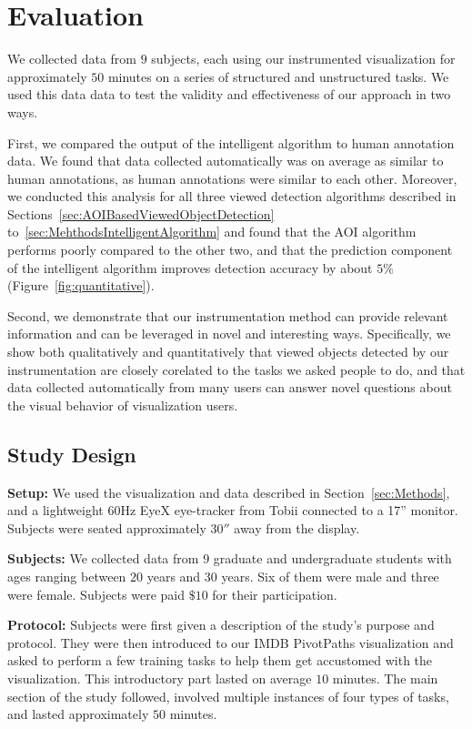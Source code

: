 \section{Evaluation}
\label{sec:Evaluation}
We collected data from $9$ subjects, each using our instrumented visualization for approximately $50$ minutes on a series of structured and unstructured tasks. We used this data data to test the validity and effectiveness of our approach in two ways. 

First, we compared the output of the intelligent algorithm to human annotation data. We found that data collected automatically was on average as similar to human annotations, as human annotations were similar to each other. Moreover, we conducted this analysis for all three viewed detection algorithms described in Sections~\ref{sec:AOIBasedViewedObjectDetection} to~\ref{sec:MehthodsIntelligentAlgorithm} and found that the AOI algorithm performs poorly compared to the other two, and that the prediction component of the intelligent algorithm improves detection accuracy by about $5\%$  (Figure~\ref{fig:quantitative}). 

Second, we demonstrate that our instrumentation method can provide relevant information and can be leveraged in novel and interesting ways. Specifically, we show both qualitatively and quantitatively that viewed objects detected by our instrumentation are closely corelated to the tasks we asked people to do, and that data collected automatically from many users can answer novel questions about the visual behavior of visualization users.  

\subsection{Study Design }
\label{sec:EvalStudyDesign}

\noindent\textbf{Setup: } We used the visualization and data described in Section~\ref{sec:Methods}, and a lightweight $60$Hz EyeX eye-tracker from Tobii connected to a 17'' monitor. Subjects were seated approximately $30''$ away from the display. 

\noindent\textbf{Subjects:} We collected data from $9$ graduate and undergraduate students with ages ranging between $20$ years and $30$ years. Six of them were male and three were female. Subjects were paid $\$10$ for their participation. 

\noindent\textbf{Protocol:} Subjects were first given a description of the study's purpose and protocol. They were then introduced to our IMDB PivotPaths visualization and asked to perform a few training tasks to help them get accustomed with the visualization. This introductory part lasted on average $10$ minutes. The main section of the study followed, involved multiple instances of four types of tasks, and lasted approximately $50$ minutes. 

